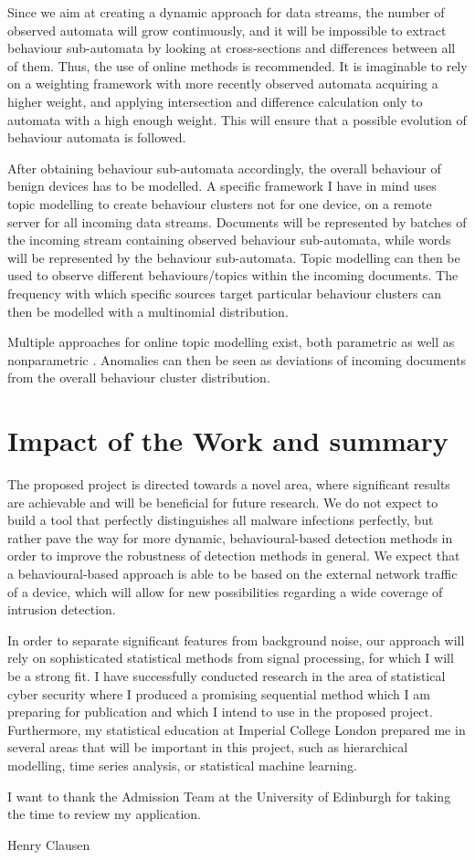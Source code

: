 \documentclass[a4paper,12pt,twoside]{report}
\begin{document}
Since we aim at creating a dynamic approach for data streams, the number of observed automata will grow continuously, and it will be impossible to extract behaviour sub-automata by looking at cross-sections and differences between all of them. Thus, the use of online methods is recommended. It is imaginable to rely on a weighting framework with more recently observed automata acquiring a higher weight, and applying intersection and difference calculation only to automata with a high enough weight. This will ensure that a possible evolution of behaviour automata is followed.


After obtaining behaviour sub-automata accordingly, the overall behaviour of benign devices has to be modelled. A specific framework I have in mind uses topic modelling to create behaviour clusters not for one device, on a remote server for all incoming data streams. Documents will be represented by batches of the incoming stream containing observed behaviour sub-automata, while words will be represented by the behaviour sub-automata. Topic modelling can then be used to observe different behaviours/topics within the incoming documents. The frequency with which specific sources target particular behaviour clusters can then be modelled with a multinomial distribution.

Multiple approaches for online topic modelling exist, both parametric \cite{NIPS2010_3902} as well as nonparametric \cite{wang2011online}. Anomalies can then be seen as deviations of incoming documents from the overall behaviour cluster distribution.

\section{Impact of the Work and summary}

The proposed project is directed towards a novel area, where significant results are achievable and will be beneficial for future research. We do not expect to build a tool that perfectly distinguishes all malware infections perfectly, but rather pave the way for more dynamic, behavioural-based detection methods in order to improve the robustness of detection methods in general. We expect that a behavioural-based approach is able to be based on the external network traffic of a device, which will allow for new possibilities regarding a wide coverage of intrusion detection. 

In order to separate significant features from background noise, our approach will rely on sophisticated statistical methods from signal processing, for which I will be a strong fit. I have successfully conducted research in the area of statistical cyber security where I produced a promising sequential method which I am preparing for publication and which I intend to use in the proposed project. Furthermore, my statistical education at Imperial College London prepared me in several areas that will be important in this project, such as hierarchical modelling, time series analysis, or statistical machine learning. 

\vspace{2cm}

\noindent I want to thank the Admission Team at the University of Edinburgh for taking the time to review my application.

\vspace{0.6cm}
\noindent Henry Clausen
\pagebreak



\end{document}
